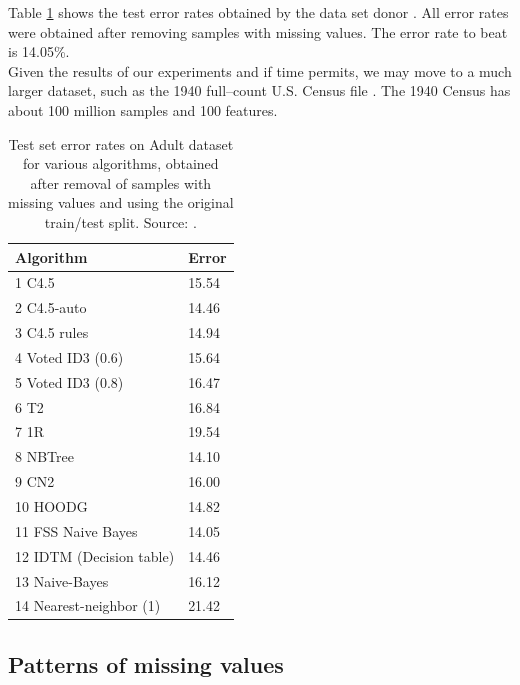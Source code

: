 \documentclass[12pt]{article}
\begin{document}
Table \ref{benchmarks} shows the test error rates obtained by the data set donor \citep{kohavi1996}. All error rates were obtained after removing samples with missing values. The error rate to beat is 14.05\%. \\

Given the results of our experiments and if time permits, we may move to a much larger dataset, such as the 1940 full--count U.S. Census file \citep{napp2008, ruggles2010}. The 1940 Census has about 100 million samples and 100 features. 

\begin{table}[htb]
\centering
\begin{tabular}{@{}ll@{}}
\toprule
\textbf{Algorithm}       & \textbf{Error} \\ \midrule
1  C4.5                  & 15.54          \\
2  C4.5-auto             & 14.46          \\
3  C4.5 rules            & 14.94          \\
4  Voted ID3 (0.6)       & 15.64          \\
5  Voted ID3 (0.8)       & 16.47          \\
6  T2                    & 16.84          \\
7  1R                    & 19.54          \\
8  NBTree                & 14.10          \\
9  CN2                   & 16.00          \\
10 HOODG                 & 14.82          \\
11 FSS Naive Bayes       & 14.05          \\
12 IDTM (Decision table) & 14.46          \\
13 Naive-Bayes           & 16.12          \\
14 Nearest-neighbor (1)  & 21.42          \\ \bottomrule
\end{tabular}
\caption{Test set error rates on Adult dataset for various algorithms, obtained after removal of samples with missing values and using the original train/test split. Source: \citet{Lichman2013}.}
\label{benchmarks}
\end{table}

\subsection{Patterns of missing values}
\end{document}
